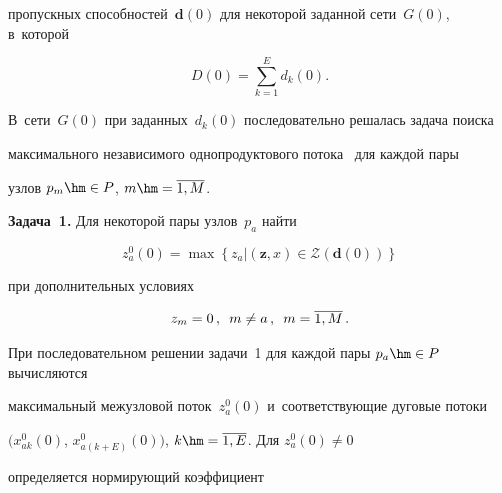 про\-пуск\-ных способностей~$\mathbf{d}(0)$  для некоторой заданной сети~$G(0)$, в~которой 





\vspace*{1pt}





\noindent


$$


 D(0) =  \sum\limits_{k=1}^{E} d_k(0).


 $$


 


 \vspace*{-2pt}


 


В~сети~$G(0)$ при заданных~$d_k(0)$ последовательно решалась задача поиска 


максимального независимого однопродуктового потока~\cite{Yen} для каж\-дой пары 


узлов $p_m \hm\in P$, $m \hm= \overline{1, M}$.





\smallskip





\noindent


\textbf{Задача~1.} Для некоторой пары узлов~$p_a$ найти 


$$ 


z_a^0 (0) = \max \left\{ z_a | (\mathbf{z}, x)  \in \mathcal{Z}(\mathbf{d}(0))\right\}  


$$


при дополнительных условиях 


$$


z_m = 0\,,\enskip m \not = a\,,\enskip m = \overline {1, M}\,. 


$$





При последовательном решении задачи~1 для каждой пары $p_a \hm\in P$ вычисляются 


максимальный межузловой поток~$z_a^0 (0)$ и~со\-от\-вет\-ст\-ву\-ющие дуговые потоки  


$(x_{ak}^0(0)$, $x_{a(k+E)}^0(0))$, $k \hm= \overline{1, E}$. Для $z_a^0(0)\not = 0$ 


определяется нормирующий коэффициент


